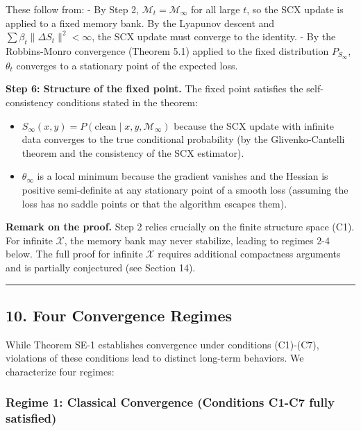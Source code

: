 \documentclass[
  12pt,
]{article}
\providecommand{\tightlist}{%
  \setlength{\itemsep}{0pt}\setlength{\parskip}{0pt}}
\begin{document}
These follow from: - By Step 2, \(\mathcal{M}_t = \mathcal{M}_\infty\)
for all large \(t\), so the SCX update is applied to a fixed memory
bank. By the Lyapunov descent and
\(\sum \beta_t \|\Delta S_t\|^2 < \infty\), the SCX update must converge
to the identity. - By the Robbins-Monro convergence (Theorem 5.1)
applied to the fixed distribution \(P_{S_\infty}\), \(\theta_t\)
converges to a stationary point of the expected loss.

\textbf{Step 6: Structure of the fixed point.} The fixed point satisfies
the self-consistency conditions stated in the theorem:

\begin{itemize}
\tightlist
\item
  \(S_\infty(x,y) = P(\text{clean} \mid x, y, \mathcal{M}_\infty)\)
  because the SCX update with infinite data converges to the true
  conditional probability (by the Glivenko-Cantelli theorem and the
  consistency of the SCX estimator).
\item
  \(\theta_\infty\) is a local minimum because the gradient vanishes and
  the Hessian is positive semi-definite at any stationary point of a
  smooth loss (assuming the loss has no saddle points or that the
  algorithm escapes them).
\end{itemize}

\textbf{Remark on the proof.} Step 2 relies crucially on the finite
structure space (C1). For infinite \(\mathcal{X}\), the memory bank may
never stabilize, leading to regimes 2-4 below. The full proof for
infinite \(\mathcal{X}\) requires additional compactness arguments and
is partially conjectured (see Section 14).

\begin{center}\rule{0.5\linewidth}{0.5pt}\end{center}

\subsection{10. Four Convergence
Regimes}\label{four-convergence-regimes}

While Theorem SE-1 establishes convergence under conditions (C1)-(C7),
violations of these conditions lead to distinct long-term behaviors. We
characterize four regimes:

\subsubsection{Regime 1: Classical Convergence (Conditions C1-C7 fully
satisfied)}\label{regime-1-classical-convergence-conditions-c1-c7-fully-satisfied}
\end{document}
